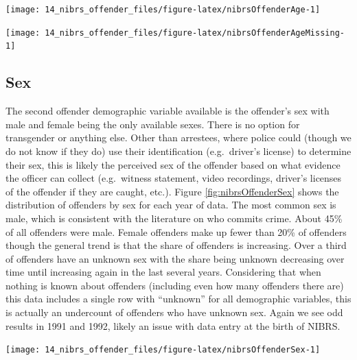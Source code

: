 \documentclass[
]{krantz}
\let\origfigure\figure
\let\endorigfigure\endfigure
\renewenvironment{figure}[1][2] {
    \expandafter\origfigure\expandafter[H]
} {
    \endorigfigure
}
\begin{document}
\begin{figure}

{\centering \texttt{[image: 14\_nibrs\_offender\_files/figure-latex/nibrsOffenderAge-1]} 

}

\caption{The mean and median age of offenders, 1991-2022.}\label{fig:nibrsOffenderAge}
\end{figure}

\begin{figure}

{\centering \texttt{[image: 14\_nibrs\_offender\_files/figure-latex/nibrsOffenderAgeMissing-1]} 

}

\caption{The percent of offender's age that is unknown, 1991-2022.}\label{fig:nibrsOffenderAgeMissing}
\end{figure}

\subsection{Sex}\label{sex-1}

The second offender demographic variable available is the
offender's sex with male and female being the only available
sexes. There is no option for transgender or anything else.
Other than arrestees, where police could (though we do not
know if they do) use their identification (e.g.~driver's
license) to determine their sex, this is likely the
perceived sex of the offender based on what evidence the
officer can collect (e.g.~witness statement, video
recordings, driver's licenses of the offender if they are
caught, etc.). Figure \ref{fig:nibrsOffenderSex} shows the
distribution of offenders by sex for each year of data. The
most common sex is male, which is consistent with the
literature on who commits crime. About 45\% of all offenders
were male. Female offenders make up fewer than 20\% of
offenders though the general trend is that the share of
offenders is increasing. Over a third of offenders have an
unknown sex with the share being unknown decreasing over
time until increasing again in the last several years.
Considering that when nothing is known about offenders
(including even how many offenders there are) this data
includes a single row with ``unknown'' for all demographic
variables, this is actually an undercount of offenders who
have unknown sex. Again we see odd results in 1991 and 1992,
likely an issue with data entry at the birth of NIBRS.

\begin{figure}

{\centering \texttt{[image: 14\_nibrs\_offender\_files/figure-latex/nibrsOffenderSex-1]} 

}

\caption{The share of offenders by sex, 1991-2022.}\label{fig:nibrsOffenderSex}
\end{figure}
\end{document}
